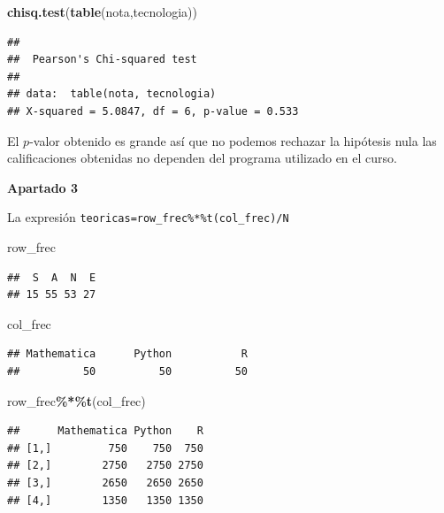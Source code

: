 \documentclass[
]{article}
\newenvironment{Shaded}{\begin{snugshade}}{\end{snugshade}}
\newcommand{\KeywordTok}[1]{\textcolor[rgb]{0.13,0.29,0.53}{\textbf{#1}}}
\newcommand{\NormalTok}[1]{#1}
\newcommand{\OperatorTok}[1]{\textcolor[rgb]{0.81,0.36,0.00}{\textbf{#1}}}
\begin{document}
\begin{Shaded}
\begin{Highlighting}[]
\KeywordTok{chisq.test}\NormalTok{(}\KeywordTok{table}\NormalTok{(nota,tecnologia))}
\end{Highlighting}
\end{Shaded}

\begin{verbatim}
## 
##  Pearson's Chi-squared test
## 
## data:  table(nota, tecnologia)
## X-squared = 5.0847, df = 6, p-value = 0.533
\end{verbatim}

El \(p\)-valor obtenido es grande así que no podemos rechazar la
hipótesis nula las calificaciones obtenidas no dependen del programa
utilizado en el curso.

\textbf{Apartado 3}

La expresión \texttt{teoricas=row\_frec\%*\%t(col\_frec)/N}

\begin{Shaded}
\begin{Highlighting}[]
\NormalTok{row\_frec  }
\end{Highlighting}
\end{Shaded}

\begin{verbatim}
##  S  A  N  E 
## 15 55 53 27
\end{verbatim}

\begin{Shaded}
\begin{Highlighting}[]
\NormalTok{col\_frec}
\end{Highlighting}
\end{Shaded}

\begin{verbatim}
## Mathematica      Python           R 
##          50          50          50
\end{verbatim}

\begin{Shaded}
\begin{Highlighting}[]
\NormalTok{row\_frec}\OperatorTok{\%*\%}\KeywordTok{t}\NormalTok{(col\_frec)}
\end{Highlighting}
\end{Shaded}

\begin{verbatim}
##      Mathematica Python    R
## [1,]         750    750  750
## [2,]        2750   2750 2750
## [3,]        2650   2650 2650
## [4,]        1350   1350 1350
\end{verbatim}
\end{document}

